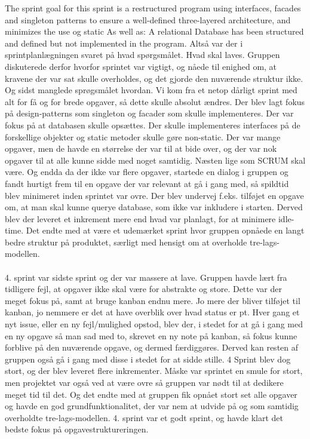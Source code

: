 The sprint goal for this sprint is a restructured program using interfaces, facades and singleton patterns to ensure a well-defined three-layered architecture, and minimizes the use og static
As well as:
A relational Database has been structured and defined but not implemented in the program.
Altså var der i sprintplanlægningen svaret på hvad spørgsmålet. Hvad skal laves. Gruppen diskuterede derfor hvorfor sprintet var vigtigt, og nåede til enighed om, at kravene der var sat skulle overholdes, og det gjorde den nuværende struktur ikke. Og sidst manglede sprøgsmålet hvordan. Vi kom fra et netop dårligt sprint med alt for få og for brede opgaver, så dette skulle absolut ændres. Der blev lagt fokus på design-patterns som singleton og facader som skulle implementeres. Der var fokus på at databasen skulle opsættes. Der skulle implementeres interfaces på de forskellige objekter og static metoder skulle gøre non-static. Der var mange opgaver, men de havde en størrelse der var til at bide over, og der var nok opgaver til at alle kunne sidde med noget samtidig. Næsten lige som SCRUM skal være. Og endda da der ikke var flere opgaver, startede en dialog i gruppen og fandt hurtigt frem til en opgave der var relevant at gå i gang med, så spildtid blev minimeret inden sprintet var ovre. Der blev undervej f.eks. tilføjet en opgave om, at man skal kunne querye database, som ikke var inkludere i starten. Derved blev der leveret et inkrement mere end hvad var planlagt, for at minimere idle-time. Det endte med at være et udemærket sprint hvor gruppen opnåede en langt bedre struktur på produktet, særligt med hensigt om at overholde tre-lags-modellen.\\\\
4. sprint var sidste sprint og der var massere at lave. Gruppen havde lært fra tidligere fejl, at opgaver ikke skal være for abstrakte og store. Dette var der meget fokus på, samt at bruge kanban endnu mere. Jo mere der bliver tilføjet til kanban, jo nemmere er det at have overblik over hvad status er pt. Hver gang et nyt issue, eller en ny fejl/mulighed opstod, blev der, i stedet for at gå i gang med en ny opgave så man sad med to, skrevet en ny note på kanban, så fokus kunne forblive på den nuværende opgave, og dermed færdiggøres. Derved kan resten af gruppen også gå i gang med disse i stedet for at sidde stille. 4 Sprint blev dog stort, og der blev leveret flere inkrementer. Måske var sprintet en smule for stort, men projektet var også ved at være ovre så gruppen var nødt til at dedikere meget tid til det. Og det endte med at gruppen fik opnået stort set alle opgaver og havde en god grundfunktionalitet, der var nem at udvide på og som samtidig overholdte tre-lags-modellen. 4. sprint var et godt sprint, og havde klart det bedste fokus på opgavestruktureringen.
